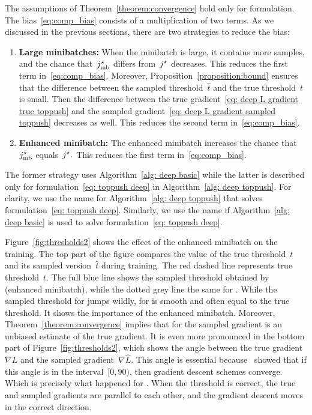 The assumptions of Theorem~\ref{theorem:convergence} hold only for \TopPush formulation. The bias~\eqref{eq:comp_bias} consists of a multiplication of two terms. As we discussed in the previous sections, there are two strategies to reduce the bias:
\begin{enumerate}
  \item \textbf{Large minibatches:} When the minibatch is large, it contains more samples, and the chance that~$j^{\star}_{\text{mb}}$ differs from~$j^{\star}$ decreases. This reduces the first term in~\eqref{eq:comp_bias}. Moreover, Proposition~\ref{proposition:bound} ensures that the difference between the sampled threshold~$\hat{t}$ and the true threshold~$t$ is small. Then the difference between the true gradient~\eqref{eq: deep L gradient true toppush} and the sampled gradient~\eqref{eq: deep L gradient sampled toppush} decreases as well. This reduces the second term in~\eqref{eq:comp_bias}.
  \item \textbf{Enhanced minibatch:} The enhanced minibatch increases the chance that~$j^{\star}_{\text{mb}}$ equals~$j^{\star}.$ This reduces the first term in~\eqref{eq:comp_bias}. 
\end{enumerate}
The former strategy uses Algorithm~\ref{alg: deep basic} while the latter is described only for formulation~\eqref{eq: toppush deep} in Algorithm~\ref{alg: deep toppush}. For clarity, we use the name \DeepTopPush for Algorithm~\ref{alg: deep toppush} that solves formulation~\eqref{eq: toppush deep}. Similarly, we use the name \TopPush if Algorithm~\ref{alg: deep basic} is used to solve formulation~\eqref{eq: toppush deep}.

Figure~\ref{fig:thresholds2} shows the effect of the enhanced minibatch on the training. The top part of the figure compares the value of the true threshold~$t$ and its sampled version~$\hat{t}$ during training. The red dashed line represents true threshold~$t.$ The full blue line shows the sampled threshold obtained by \DeepTopPush (enhanced minibatch), while the dotted grey line the same for \TopPush. While the sampled threshold for \TopPush jumps wildly, for \DeepTopPush is smooth and often equal to the true threshold. It shows the importance of the enhanced minibatch. Moreover, Theorem~\ref{theorem:convergence} implies that for \DeepTopPush the sampled gradient is an unbiased estimate of the true gradient. It is even more pronounced in the bottom part of Figure~\ref{fig:thresholds2}, which shows the angle between the true gradient~$\nabla L$ and the sampled gradient~$\nabla \hat{L}.$ This angle is essential because~\cite{nocedal2006numerical} showed that if this angle is in the interval~$[0, 90)$, then gradient descent schemes converge. Which is precisely what happened for \DeepTopPush. When the threshold is correct, the true and sampled gradients are parallel to each other, and the gradient descent moves in the correct direction.

